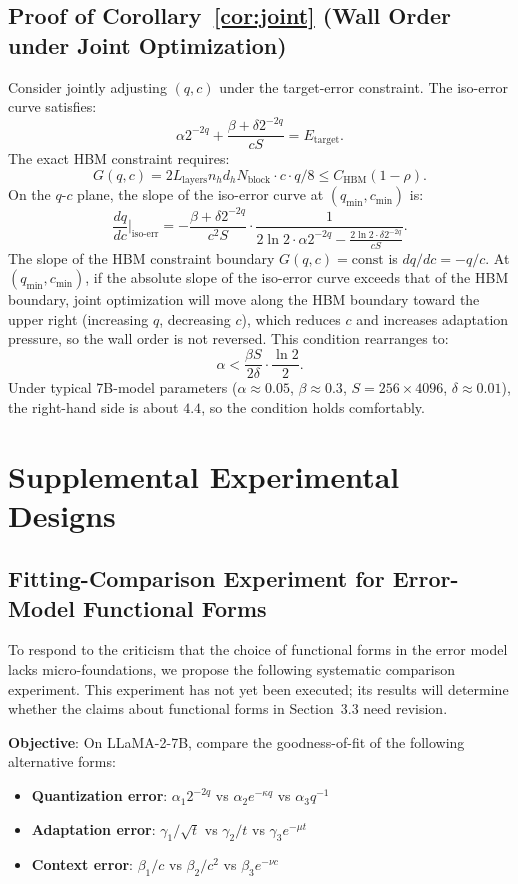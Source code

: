 \documentclass[11pt,a4paper]{article}
\theoremstyle{plain}
\theoremstyle{definition}
\begin{document}
\subsection{Proof of Corollary~\ref{cor:joint} (Wall Order under Joint Optimization)}

Consider jointly adjusting $(q,c)$ under the target-error constraint. The iso-error curve satisfies:
\[
\alpha 2^{-2q} + \frac{\beta + \delta 2^{-2q}}{cS} = E_{\text{target}}.
\]
The exact HBM constraint requires:
\[
G(q,c) = 2 L_{\text{layers}} n_h d_h N_{\text{block}} \cdot c \cdot q / 8 \leq C_{\text{HBM}}(1-\rho).
\]
On the $q$-$c$ plane, the slope of the iso-error curve at $(q_{\min}, c_{\min})$ is:
\[
\frac{dq}{dc}\bigg|_{\text{iso-err}} = - \frac{\beta + \delta 2^{-2q}}{c^2 S} \cdot \frac{1}{2\ln 2 \cdot \alpha 2^{-2q} - \frac{2\ln 2 \cdot \delta 2^{-2q}}{cS}}.
\]
The slope of the HBM constraint boundary $G(q,c) = \text{const}$ is $dq/dc = -q/c$. At $(q_{\min}, c_{\min})$, if the absolute slope of the iso-error curve exceeds that of the HBM boundary, joint optimization will move along the HBM boundary toward the upper right (increasing $q$, decreasing $c$), which reduces $c$ and increases adaptation pressure, so the wall order is not reversed. This condition rearranges to:
\[
\alpha < \frac{\beta S}{2\delta} \cdot \frac{\ln 2}{2}.
\]
Under typical 7B-model parameters ($\alpha \approx 0.05$, $\beta \approx 0.3$, $S=256\times4096$, $\delta \approx 0.01$), the right-hand side is about $4.4$, so the condition holds comfortably.

\section{Supplemental Experimental Designs}

\subsection{Fitting-Comparison Experiment for Error-Model Functional Forms}\label{app:fitting}

To respond to the criticism that the choice of functional forms in the error model lacks micro-foundations, we propose the following systematic comparison experiment. This experiment has not yet been executed; its results will determine whether the claims about functional forms in Section~3.3 need revision.

\textbf{Objective}: On LLaMA-2-7B, compare the goodness-of-fit of the following alternative forms:
\begin{itemize}
    \item \textbf{Quantization error}: $\alpha_1 2^{-2q}$ vs $\alpha_2 e^{-\kappa q}$ vs $\alpha_3 q^{-1}$
    \item \textbf{Adaptation error}: $\gamma_1 / \sqrt{t}$ vs $\gamma_2 / t$ vs $\gamma_3 e^{-\mu t}$
    \item \textbf{Context error}: $\beta_1 / c$ vs $\beta_2 / c^2$ vs $\beta_3 e^{-\nu c}$
\end{itemize}
\end{document}
